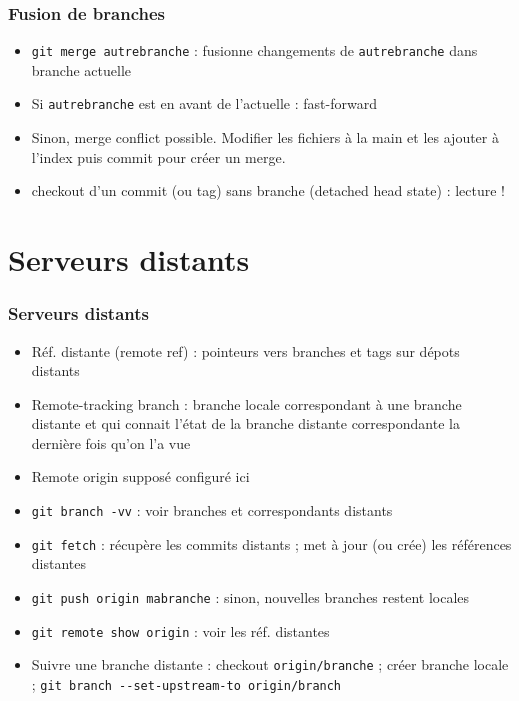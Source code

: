\documentclass[english, french]{beamer}
\begin{document}
\begin{frame}
	\frametitle{Fusion de branches}
	{
	\centering
	\par
	}
	\begin{itemize}
		\item \texttt{git merge autrebranche} : fusionne changements de \texttt{autrebranche} dans branche actuelle
		\item Si \texttt{autrebranche} est en avant de l’actuelle : \og{}fast-forward\fg{}
		\item Sinon, \og{}merge conflict\fg{} possible. Modifier les fichiers à la main et les ajouter à l’index puis commit pour créer un merge.
		\item checkout d’un commit {\tiny (ou tag)} sans branche {\tiny (detached head state)} : lecture !
	\end{itemize}
\end{frame}

\section{Serveurs distants}
\begin{frame}
	\frametitle{Serveurs distants}
	\vspace{-1pt}
	\begin{itemize}
		\item Réf. distante (\og{}remote ref\fg{}) : pointeurs vers branches {\tiny et tags} sur dépots distants
		\item \og{}Remote-tracking branch\fg{} : branche locale correspondant à une branche distante et qui connait l’état de la branche distante correspondante la dernière fois qu’on l’a vue
		\item Remote \og{}origin\fg{} supposé configuré ici
		\item \texttt{git branch -vv} : voir branches et correspondants distants
		\item \texttt{git fetch} : récupère les commits distants ; met à jour (ou crée) les références distantes
		\item \texttt{git push origin mabranche} : sinon, nouvelles branches restent locales
		\item \texttt{git remote show origin} : voir les réf. distantes
		\item Suivre une branche distante : checkout \texttt{origin/branche} ; créer branche locale ; \texttt{git branch -{}-set-upstream-to origin/branch}
	\end{itemize}
\end{frame}
\end{document}
